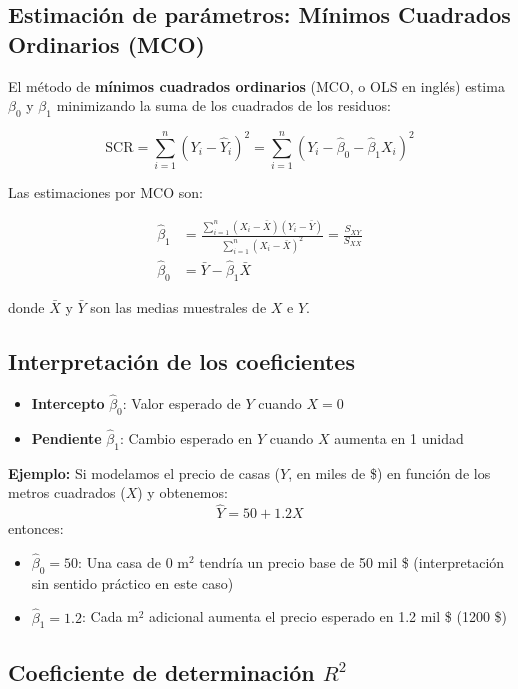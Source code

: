 \documentclass[11pt,a4paper]{article}
\begin{document}
\subsection{Estimación de parámetros: Mínimos Cuadrados Ordinarios (MCO)}

El método de \textbf{mínimos cuadrados ordinarios} (MCO, o OLS en inglés) estima $\beta_0$ y $\beta_1$ minimizando la suma de los cuadrados de los residuos:

\begin{equation}
\text{SCR} = \sum_{i=1}^{n} (Y_i - \hat{Y}_i)^2 = \sum_{i=1}^{n} (Y_i - \hat{\beta}_0 - \hat{\beta}_1 X_i)^2
\end{equation}

Las estimaciones por MCO son:

\begin{align}
\hat{\beta}_1 &= \frac{\sum_{i=1}^{n} (X_i - \bar{X})(Y_i - \bar{Y})}{\sum_{i=1}^{n} (X_i - \bar{X})^2} = \frac{S_{XY}}{S_{XX}} \\
\hat{\beta}_0 &= \bar{Y} - \hat{\beta}_1 \bar{X}
\end{align}

donde $\bar{X}$ y $\bar{Y}$ son las medias muestrales de $X$ e $Y$.

\subsection{Interpretación de los coeficientes}

\begin{itemize}
    \item \textbf{Intercepto} $\hat{\beta}_0$: Valor esperado de $Y$ cuando $X = 0$
    \item \textbf{Pendiente} $\hat{\beta}_1$: Cambio esperado en $Y$ cuando $X$ aumenta en 1 unidad
\end{itemize}

\textbf{Ejemplo:} Si modelamos el precio de casas ($Y$, en miles de \$) en función de los metros cuadrados ($X$) y obtenemos:
\[
\hat{Y} = 50 + 1.2 X
\]
entonces:
\begin{itemize}
    \item $\hat{\beta}_0 = 50$: Una casa de 0 m$^2$ tendría un precio base de 50 mil \$ (interpretación sin sentido práctico en este caso)
    \item $\hat{\beta}_1 = 1.2$: Cada m$^2$ adicional aumenta el precio esperado en 1.2 mil \$ (1200 \$)
\end{itemize}

\subsection{Coeficiente de determinación $R^2$}
\end{document}
